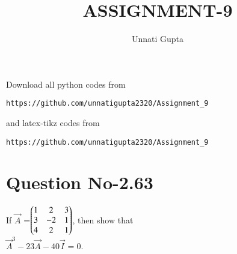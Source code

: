 \documentclass[journal,12pt,twocolumn]{IEEEtran}
\begin{document}
     \def\centbox#1{\makebox[0in]{#1}}
     \def\topbox#1{\raisebox{-\baselineskip}[0in][0in]{#1}}
     \def\midbox#1{\raisebox{-0.5\baselineskip}[0in][0in]{#1}}
\vspace{3cm}
\title{ASSIGNMENT-9}
\author{Unnati Gupta}
\maketitle
\newpage
\bigskip
\renewcommand{\thefigure}{\theenumi}
\renewcommand{\thetable}{\theenumi}
Download all python codes from 
\begin{lstlisting}
https://github.com/unnatigupta2320/Assignment_9
\end{lstlisting}
%
and latex-tikz codes from 
%
\begin{lstlisting}
https://github.com/unnatigupta2320/Assignment_9
\end{lstlisting}
%
\section{Question No-2.63}
If $\vec{A}$ =$\begin{pmatrix}1&2&3\\3&-2&1\\4&2&1\end{pmatrix}$, then show that \\$\vec{A}^3-23\vec{A}-40\vec{I}=0$.
\end{document}
